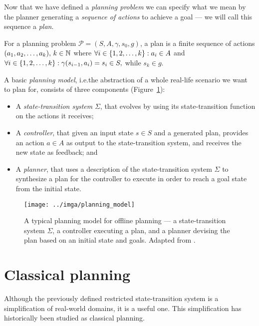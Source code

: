 Now that we have defined a \textit{planning problem} we can specify what we mean
by the planner generating a \textit{sequence of actions} to achieve a goal --- we will
call this sequence a \textit{plan}.

\begin{defn}[Plan]\label{defn:plan}\citep[Section~1.5]{Ghallab2004}
For a planning problem $\mathcal{P} = (S, A, \gamma, s_0, g)$,
a plan is a finite sequence of actions $(a_1, a_2, \ldots, a_k),\, k \in \mathbb{N}$ where
$\forall i \in \{1, 2, \ldots, k\} : a_i \in A$ and
$\forall i \in \{1, 2, \ldots, k\} : \gamma(s_{i-1}, a_i) = s_i \in S,$ while $s_k \in g$.
\end{defn}

A basic \textit{planning model}, i.e.\;the abstraction of a whole real-life scenario
we want to plan for, consists of three components (Figure~\ref{fig:planning-model}):
\begin{itemize}
\item A \textit{state-transition system} $\Sigma$, that evolves by using its state-transition function on the actions
it receives;
\item A \textit{controller}, that given an input state $s \in S$ and a generated plan, provides an action $a \in A$ as output
to the state-transition system, and receives the new
state as feedback; and
\item A \textit{planner}, that uses a description of the state-transition system $\Sigma$ to synthesize a plan for the controller
to execute in order to reach a goal state from the initial state.
\end{itemize}

\begin{figure}[tb]
\begin{center}
\texttt{[image: ../imga/planning\_model]}
\end{center}
\caption[A typical planning model for offline planning.]{A typical planning model for offline planning --- a state-transition system $\Sigma$, a controller executing a plan, and a planner devising the plan based on an initial state and goals. Adapted from \citep[Figure~1.3]{Ghallab2004}.}
\label{fig:planning-model}
\end{figure}

\section{Classical planning}\label{classical-planning}

Although the previously defined restricted state-transition system is a simplification of real-world
domains, it is a useful one. 
This simplification has historically been studied as classical planning.

